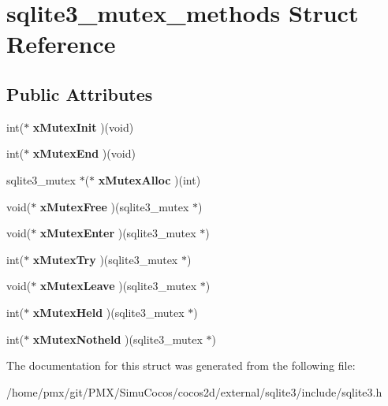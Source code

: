 \hypertarget{structsqlite3__mutex__methods}{}\section{sqlite3\+\_\+mutex\+\_\+methods Struct Reference}
\label{structsqlite3__mutex__methods}
\subsection*{Public Attributes}
\begin{DoxyCompactItemize}
\item 
\mbox{\label{structsqlite3__mutex__methods_af0a78d79b6029444d4a2ac7c474030d4}} 
int($\ast$ {\bfseries x\+Mutex\+Init} )(void)
\item 
\mbox{\label{structsqlite3__mutex__methods_a4963efb4bfede244d4d2a14510dbfe68}} 
int($\ast$ {\bfseries x\+Mutex\+End} )(void)
\item 
\mbox{\label{structsqlite3__mutex__methods_a1092d5c1659c494c5235e884def5e275}} 
sqlite3\+\_\+mutex $\ast$($\ast$ {\bfseries x\+Mutex\+Alloc} )(int)
\item 
\mbox{\label{structsqlite3__mutex__methods_a4e58d446a7225ce91073eb0af91d219a}} 
void($\ast$ {\bfseries x\+Mutex\+Free} )(sqlite3\+\_\+mutex $\ast$)
\item 
\mbox{\label{structsqlite3__mutex__methods_ac60f7bb165e9770949a8a2b2c2632830}} 
void($\ast$ {\bfseries x\+Mutex\+Enter} )(sqlite3\+\_\+mutex $\ast$)
\item 
\mbox{\label{structsqlite3__mutex__methods_a45682df41bdfcb267a696090c80ebd06}} 
int($\ast$ {\bfseries x\+Mutex\+Try} )(sqlite3\+\_\+mutex $\ast$)
\item 
\mbox{\label{structsqlite3__mutex__methods_acfa193f9130bfc68caf7f1849bcd0dac}} 
void($\ast$ {\bfseries x\+Mutex\+Leave} )(sqlite3\+\_\+mutex $\ast$)
\item 
\mbox{\label{structsqlite3__mutex__methods_a5d30a95c614bc08fe156c9ea0f0d88e8}} 
int($\ast$ {\bfseries x\+Mutex\+Held} )(sqlite3\+\_\+mutex $\ast$)
\item 
\mbox{\label{structsqlite3__mutex__methods_a7bc1edfd01c67c6dcee26299bc31a7bf}} 
int($\ast$ {\bfseries x\+Mutex\+Notheld} )(sqlite3\+\_\+mutex $\ast$)
\end{DoxyCompactItemize}


The documentation for this struct was generated from the following file\+:\begin{DoxyCompactItemize}
\item 
/home/pmx/git/\+P\+M\+X/\+Simu\+Cocos/cocos2d/external/sqlite3/include/sqlite3.\+h\end{DoxyCompactItemize}
